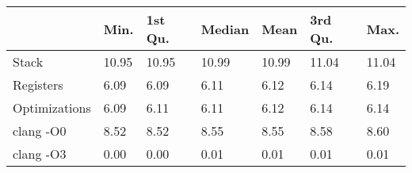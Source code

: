 \begin{table}[ht]
\centering
\begin{tabular}{p{}p{}p{}p{}p{}p{}p{}}
  \hline
 & Min. & 1st Qu. & Median & Mean & 3rd Qu. & Max. \\ 
  \hline
Stack & 10.95 & 10.95 & 10.99 & 10.99 & 11.04 & 11.04 \\ 
  Registers & 6.09 & 6.09 & 6.11 & 6.12 & 6.14 & 6.19 \\ 
  Optimizations & 6.09 & 6.11 & 6.11 & 6.12 & 6.14 & 6.14 \\ 
  clang -O0 & 8.52 & 8.52 & 8.55 & 8.55 & 8.58 & 8.60 \\ 
  clang -O3 & 0.00 & 0.00 & 0.01 & 0.01 & 0.01 & 0.01 \\ 
   \hline
\end{tabular}
\end{table}
